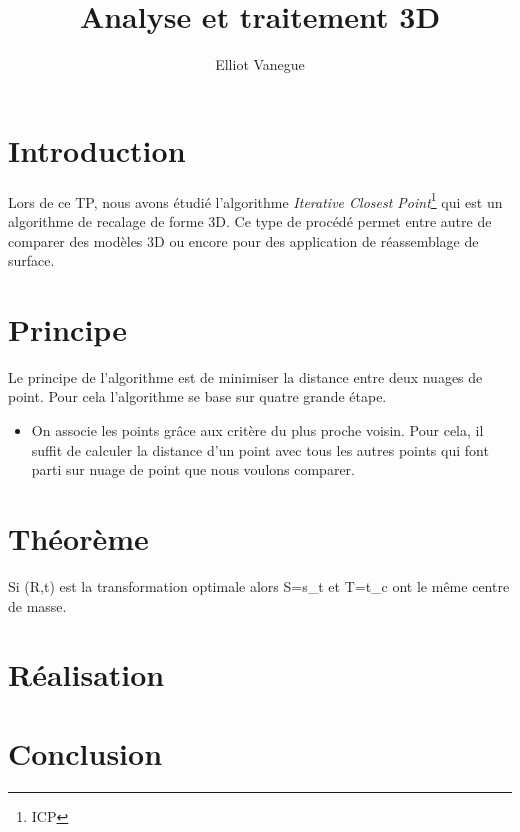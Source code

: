 \documentclass[a4paper,10pt]{article}
\title{Analyse et traitement 3D}
\author{Elliot Vanegue}
\begin{document}
\maketitle

\section{Introduction}
Lors de ce TP, nous avons étudié l'algorithme \textit{Iterative Closest Point}\footnote{ICP} qui est un algorithme de
recalage de forme 3D. Ce type de procédé permet entre autre de comparer des modèles 3D ou encore pour des application 
de réassemblage de surface.

\section{Principe}
Le principe de l'algorithme est de minimiser la distance entre deux nuages de point. Pour cela l'algorithme se base 
sur quatre grande étape.
\begin{itemize}
 \item On associe les points grâce aux critère du plus proche voisin. Pour cela, il suffit de calculer la distance
 d'un point avec tous les autres points qui font parti sur nuage de point que nous voulons comparer.
\end{itemize}


\section{Théorème}
Si (R,t) est la transformation optimale alors S={s_t} et T={t_c} ont le même centre de masse.
\section{Réalisation}

\section{Conclusion}
\end{document}
